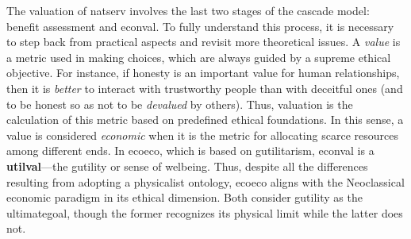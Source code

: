\documentclass[./main_en.tex]{subfiles}
\begin{document}
\par The valuation of \gls{natserv} involves the last two stages of the cascade model: benefit assessment and \gls{econval}. To fully understand this process, it is necessary to step back from practical aspects and revisit more theoretical issues. A \textit{value} is a metric used in making choices, which are always guided by a supreme ethical objective. For instance, if honesty is an important value for human relationships, then it is \textit{better} to interact with trustworthy people than with deceitful ones (and to be honest so as not to be \textit{devalued} by others). Thus, valuation is the calculation of this metric based on predefined ethical foundations. In this sense, a value is considered \textit{economic} when it is the metric for allocating scarce resources among different ends. In \gls{ecoeco}, which is based on \gls{gutilitarism}, \gls{econval} is a \textbf{\gls{utilval}}—the \gls{gutility} or sense of \gls{welbeing}. Thus, despite all the differences resulting from adopting a physicalist ontology, \gls{ecoeco} aligns with the Neoclassical economic paradigm in its ethical dimension. Both consider \gls{gutility} as the \gls{ultimategoal}, though the former recognizes its physical limit while the latter does not.
\end{document}
